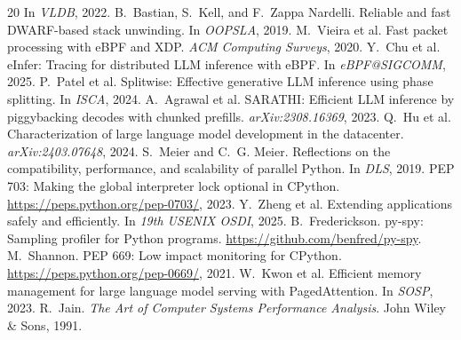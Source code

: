 \documentclass[letterpaper,twocolumn,10pt]{article}
\begin{document}
\begin{thebibliography}{20}
In \emph{VLDB}, 2022.
 B.~Bastian, S.~Kell, and F.~Zappa Nardelli. Reliable and
fast DWARF-based stack unwinding. In \emph{OOPSLA}, 2019.
 M.~Vieira et al. Fast packet processing with eBPF and
XDP. \emph{ACM Computing Surveys}, 2020.
 Y.~Chu et al. eInfer: Tracing for distributed LLM
inference with eBPF. In \emph{eBPF@SIGCOMM}, 2025.
 P.~Patel et al. Splitwise: Effective generative LLM
inference using phase splitting. In \emph{ISCA}, 2024.
 A.~Agrawal et al. SARATHI: Efficient LLM inference by
piggybacking decodes with chunked prefills. \emph{arXiv:2308.16369},
2023.
 Q.~Hu et al. Characterization of large language model
development in the datacenter. \emph{arXiv:2403.07648}, 2024.
 S.~Meier and C.~G. Meier. Reflections on the
compatibility, performance, and scalability of parallel Python.
In \emph{DLS}, 2019.
 PEP 703: Making the global interpreter lock optional in
CPython. \url{https://peps.python.org/pep-0703/}, 2023.
 Y.~Zheng et al. Extending applications safely and
efficiently. In \emph{19th USENIX OSDI}, 2025.
 B.~Frederickson. py-spy: Sampling profiler for Python
programs. \url{https://github.com/benfred/py-spy}.
 M.~Shannon. PEP 669: Low impact monitoring for CPython.
\url{https://peps.python.org/pep-0669/}, 2021.
 W.~Kwon et al. Efficient memory management for large
language model serving with PagedAttention. In \emph{SOSP}, 2023.
 R.~Jain. \emph{The Art of Computer Systems Performance
Analysis}. John Wiley \& Sons, 1991.
\end{thebibliography}
\end{document}
